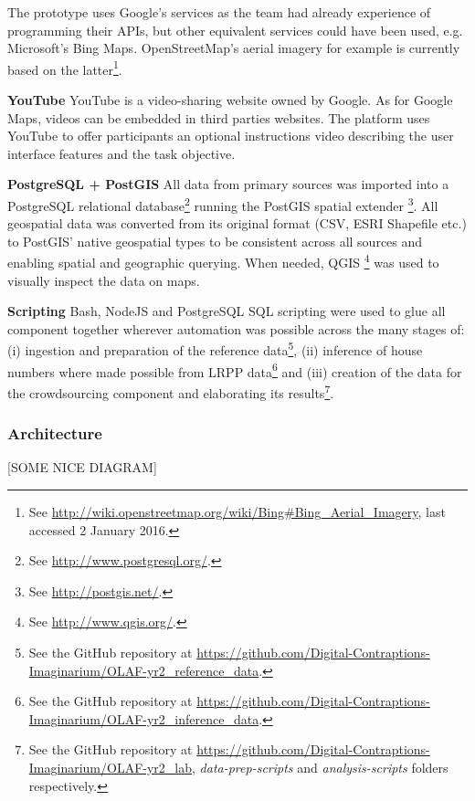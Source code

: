 The prototype uses Google's services as the team had already experience of programming their APIs, but other equivalent services could have been used, e.g. Microsoft's Bing Maps. OpenStreetMap's aerial imagery for example is currently based on the latter\footnote{See \url{http://wiki.openstreetmap.org/wiki/Bing#Bing_Aerial_Imagery}, last accessed 2 January 2016.}.

\textbf{YouTube} YouTube is a video-sharing website owned by Google. As for Google Maps, videos can be embedded in third parties websites. The platform uses YouTube to offer participants an optional instructions video describing the user interface features and the task objective.




\textbf{PostgreSQL + PostGIS} All data from primary sources was imported into a PostgreSQL relational database\footnote{See \url{http://www.postgresql.org/}.} running the PostGIS spatial extender \footnote{See \url{http://postgis.net/}.}. All geospatial data was converted from its original format (CSV, ESRI Shapefile etc.) to PostGIS' native geospatial types to be consistent across all sources and enabling spatial and geographic querying. When needed, QGIS \footnote{See \url{http://www.qgis.org/}.} was used to visually inspect the data on maps.

\textbf{Scripting} Bash, NodeJS and PostgreSQL SQL scripting were used to glue all component together wherever automation was possible across the many stages of: (i) ingestion and preparation of the reference data\footnote{See the GitHub repository at \url{https://github.com/Digital-Contraptions-Imaginarium/OLAF-yr2_reference_data}.}, (ii) inference of house numbers where made possible from LRPP data\footnote{See the GitHub repository at \url{https://github.com/Digital-Contraptions-Imaginarium/OLAF-yr2_inference_data}.} and (iii) creation of the data for the crowdsourcing component and elaborating its results\footnote{See the GitHub repository at \url{https://github.com/Digital-Contraptions-Imaginarium/OLAF-yr2_lab}, {\it data-prep-scripts} and {\it analysis-scripts} folders respectively.}.  

\subsubsection{Architecture}

[SOME NICE DIAGRAM]